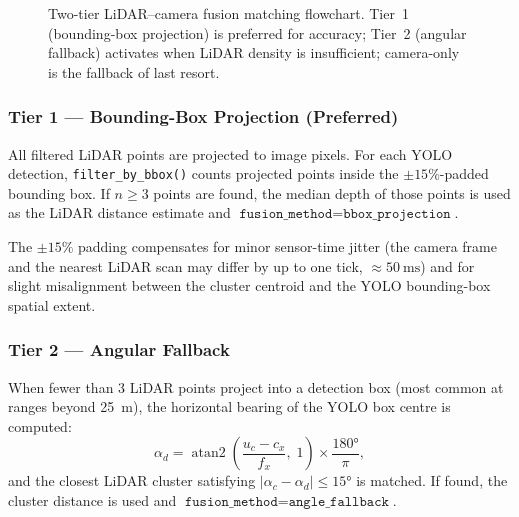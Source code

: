 \documentclass[12pt,a4paper]{article}
\begin{document}
\begin{figure}[H]
\caption{Two-tier LiDAR--camera fusion matching flowchart.  Tier~1 (bounding-box
  projection) is preferred for accuracy; Tier~2 (angular fallback) activates
  when LiDAR density is insufficient; camera-only is the fallback of last resort.}
\label{fig:fusion_flowchart}
\end{figure}

\subsubsection{Tier 1 --- Bounding-Box Projection (Preferred)}

All filtered LiDAR points are projected to image pixels.  For each YOLO
detection, \texttt{filter\_by\_bbox()} counts projected points inside the
$\pm15\%$-padded bounding box.  If $n \ge 3$ points are found, the median
depth of those points is used as the LiDAR distance estimate and
$\texttt{fusion\_method} = \texttt{bbox\_projection}$.

The $\pm15\%$ padding compensates for minor sensor-time jitter (the camera
frame and the nearest LiDAR scan may differ by up to one tick,
$\approx\SI{50}{\milli\second}$) and for slight misalignment between the
cluster centroid and the YOLO bounding-box spatial extent.

\subsubsection{Tier 2 --- Angular Fallback}

When fewer than 3 LiDAR points project into a detection box (most common at
ranges beyond \SI{25}{\metre}), the horizontal bearing of the YOLO box centre
is computed:
\begin{equation}
  \alpha_d = \operatorname{atan2}\!\!\left(
    \frac{u_c - c_x}{f_x},\; 1
  \right) \times \frac{180°}{\pi},
  \label{eq:bbox_angle}
\end{equation}
and the closest LiDAR cluster satisfying $|\alpha_c - \alpha_d| \le 15°$
is matched.  If found, the cluster distance is used and
$\texttt{fusion\_method} = \texttt{angle\_fallback}$.
\end{document}
